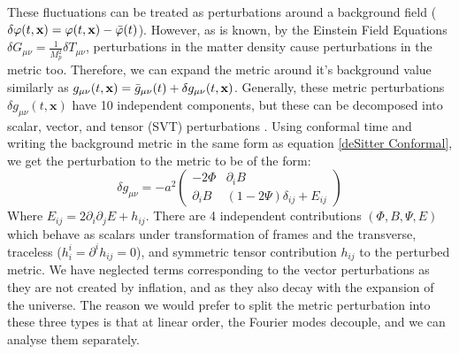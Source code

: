 \documentclass[aps,prd,reprint,preprintnumbers,showpacs,floatfix,nofootinbib,superscript address]{revtex4-2}
\begin{document}
These fluctuations can be treated as perturbations around a background field ($\delta\varphi(t,\textbf{x}) = \varphi(t,\textbf{x}) - \Bar{\varphi}(t)$). However, as is known, by the Einstein Field Equations $\delta G_{\mu\nu} = \frac{1}{M_p^2}\delta T_{\mu \nu}$, perturbations in the matter density cause perturbations in the metric too. Therefore, we can expand the metric around it's background value similarly as $g_{\mu\nu}(t,\textbf{x}) = \Bar{g}_{\mu\nu}(t) + \delta g_{\mu\nu}(t,\textbf{x})$. Generally, these metric perturbations $\delta g_{\mu\nu}(t,\textbf{x})$ have 10 independent components, but these can be decomposed into scalar, vector, and tensor (SVT) perturbations \cite{liddle_cosmological_2000, malik_cosmological_2009}. Using conformal time and writing the background metric in the same form as equation \ref{deSitter Conformal}, we get the perturbation to the metric to be of the form:
\begin{equation} \label{Perturbed metric}
    \delta g_{\mu\nu}
    = 
    -a^2
    \begin{pmatrix}
        -2 \Phi & \partial_iB \\
        \partial_iB & (1-2\Psi)\delta_{ij} + E_{ij} 
    \end{pmatrix}
\end{equation}
Where $E_{ij} = 2\partial_i\partial_j E + h_{ij}$. There are 4 independent contributions $(\Phi, B, \Psi, E)$ which behave as scalars under transformation of frames and the transverse, traceless ($h_i^i = \partial^ih_{ij} = 0$), and symmetric tensor contribution $h_{ij}$ to the perturbed metric. We have neglected terms corresponding to the vector perturbations as they are not created by inflation, and as they also decay with the expansion of the universe. The reason we would prefer to split the metric perturbation into these three types is that at linear order, the Fourier modes decouple, and we can analyse them separately. 
\end{document}

